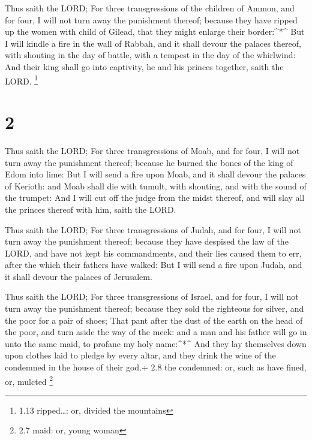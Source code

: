  Thus saith the LORD; For three transgressions of the
children of Ammon, and for four, I will not turn away the punishment
thereof; because they have ripped up the women with child of Gilead,
that they might enlarge their border:\^{}*\^{}  But I will
kindle a fire in the wall of Rabbah, and it shall devour the palaces
thereof, with shouting in the day of battle, with a tempest in the day
of the whirlwind:  And their king shall go into captivity,
he and his princes together, saith the LORD. \footnote{1.13
  ripped\ldots: or, divided the mountains}

\hypertarget{section-1}{%
\section{2}\label{section-1}}

 Thus saith the LORD; For three transgressions of Moab, and
for four, I will not turn away the punishment thereof; because he burned
the bones of the king of Edom into lime:  But I will send a
fire upon Moab, and it shall devour the palaces of Kerioth: and Moab
shall die with tumult, with shouting, and with the sound of the trumpet:
 And I will cut off the judge from the midst thereof, and
will slay all the princes thereof with him, saith the LORD.

 Thus saith the LORD; For three transgressions of Judah, and
for four, I will not turn away the punishment thereof; because they have
despised the law of the LORD, and have not kept his commandments, and
their lies caused them to err, after the which their fathers have
walked:  But I will send a fire upon Judah, and it shall
devour the palaces of Jerusalem.

 Thus saith the LORD; For three transgressions of Israel,
and for four, I will not turn away the punishment thereof; because they
sold the righteous for silver, and the poor for a pair of shoes;
 That pant after the dust of the earth on the head of the
poor, and turn aside the way of the meek: and a man and his father will
go in unto the same maid, to profane my holy name:\^{}*\^{} 
And they lay themselves down upon clothes laid to pledge by every altar,
and they drink the wine of the condemned in the house of their god.+ 2.8
the condemned: or, such as have fined, or, mulcted \footnote{2.7 maid:
  or, young woman}

